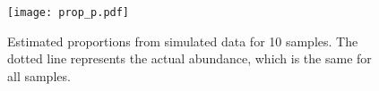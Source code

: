 

\begin{figure}[!ht]
    \centering
    \texttt{[image: prop\_p.pdf]}
    \caption{Estimated proportions from simulated data for 10 samples.
             The dotted line represents the actual abundance, which is the same for 
             all samples.}
    \label{fig:proportions}
\end{figure}